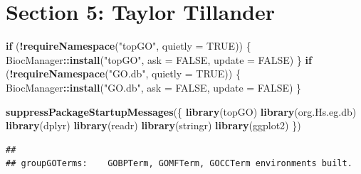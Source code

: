 \documentclass[
]{article}
\newenvironment{Shaded}{\begin{snugshade}}{\end{snugshade}}
\newcommand{\AttributeTok}[1]{\textcolor[rgb]{0.13,0.29,0.53}{#1}}
\newcommand{\ConstantTok}[1]{\textcolor[rgb]{0.56,0.35,0.01}{#1}}
\newcommand{\ControlFlowTok}[1]{\textcolor[rgb]{0.13,0.29,0.53}{\textbf{#1}}}
\newcommand{\FunctionTok}[1]{\textcolor[rgb]{0.13,0.29,0.53}{\textbf{#1}}}
\newcommand{\NormalTok}[1]{#1}
\newcommand{\SpecialCharTok}[1]{\textcolor[rgb]{0.81,0.36,0.00}{\textbf{#1}}}
\newcommand{\StringTok}[1]{\textcolor[rgb]{0.31,0.60,0.02}{#1}}
\begin{document}
\section{Section 5: Taylor Tillander}\label{section-5-taylor-tillander}

\begin{Shaded}
\begin{Highlighting}[]
\ControlFlowTok{if}\NormalTok{ (}\SpecialCharTok{!}\FunctionTok{requireNamespace}\NormalTok{(}\StringTok{"topGO"}\NormalTok{, }\AttributeTok{quietly =} \ConstantTok{TRUE}\NormalTok{)) \{}
\NormalTok{  BiocManager}\SpecialCharTok{::}\FunctionTok{install}\NormalTok{(}\StringTok{"topGO"}\NormalTok{, }\AttributeTok{ask =} \ConstantTok{FALSE}\NormalTok{, }\AttributeTok{update =} \ConstantTok{FALSE}\NormalTok{)}
\NormalTok{\}}
\ControlFlowTok{if}\NormalTok{ (}\SpecialCharTok{!}\FunctionTok{requireNamespace}\NormalTok{(}\StringTok{"GO.db"}\NormalTok{, }\AttributeTok{quietly =} \ConstantTok{TRUE}\NormalTok{)) \{}
\NormalTok{  BiocManager}\SpecialCharTok{::}\FunctionTok{install}\NormalTok{(}\StringTok{"GO.db"}\NormalTok{, }\AttributeTok{ask =} \ConstantTok{FALSE}\NormalTok{, }\AttributeTok{update =} \ConstantTok{FALSE}\NormalTok{)}
\NormalTok{\}}

\FunctionTok{suppressPackageStartupMessages}\NormalTok{(\{}
  \FunctionTok{library}\NormalTok{(topGO)}
  \FunctionTok{library}\NormalTok{(org.Hs.eg.db)}
  \FunctionTok{library}\NormalTok{(dplyr)}
  \FunctionTok{library}\NormalTok{(readr)}
  \FunctionTok{library}\NormalTok{(stringr)}
  \FunctionTok{library}\NormalTok{(ggplot2)}
\NormalTok{\})}
\end{Highlighting}
\end{Shaded}

\begin{verbatim}
## 
## groupGOTerms:    GOBPTerm, GOMFTerm, GOCCTerm environments built.
\end{verbatim}
\end{document}

